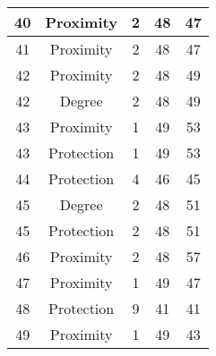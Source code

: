 \documentclass[results.tex]{subfiles}
\begin{document}
\begin{center}
\begin{tabular}{| c || c | c | c | c |}
            \hline
            40                      & Proximity                    & 2                      & 48                      & 47                   \\
            \hline
            41                      & Proximity                    & 2                      & 48                      & 47                   \\
            \hline
            42                      & Proximity                    & 2                      & 48                      & 49                   \\
            \hline
            42                      & Degree                       & 2                      & 48                      & 49                   \\
            \hline
            43                      & Proximity                    & 1                      & 49                      & 53                   \\
            \hline
            43                      & Protection                   & 1                      & 49                      & 53                   \\
            \hline
            44                      & Protection                   & 4                      & 46                      & 45                   \\
            \hline
            45                      & Degree                       & 2                      & 48                      & 51                   \\
            \hline
            45                      & Protection                   & 2                      & 48                      & 51                   \\
            \hline
            46                      & Proximity                    & 2                      & 48                      & 57                   \\
            \hline
            47                      & Proximity                    & 1                      & 49                      & 47                   \\
            \hline
            48                      & Protection                   & 9                      & 41                      & 41                   \\
            \hline
            49                      & Proximity                    & 1                      & 49                      & 43                   \\
            \hline
        \end{tabular}
    \end{center}
\end{document}
